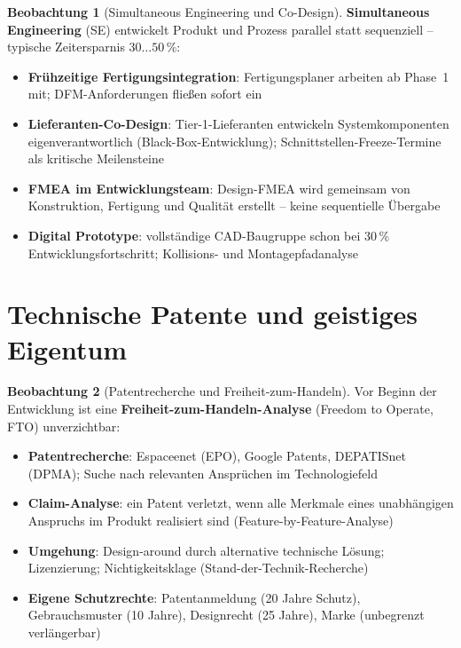 ﻿\documentclass[a4paper,12pt]{report}
\theoremstyle{definition}
\newtheorem{beobachtung}{Beobachtung}
\begin{document}
\begin{beobachtung}[Simultaneous Engineering und Co-Design]
\textbf{Simultaneous Engineering} (SE) entwickelt Produkt und Prozess
parallel statt sequenziell -- typische Zeitersparnis $30\ldots50\,\%$:
\begin{itemize}
    \item[-] \textbf{Frühzeitige Fertigungsintegration}: Fertigungsplaner
          arbeiten ab Phase~1 mit; DFM-Anforderungen fließen sofort ein
    \item[-] \textbf{Lieferanten-Co-Design}: Tier-1-Lieferanten entwickeln
          Systemkomponenten eigenverantwortlich (Black-Box-Entwicklung);
          Schnittstellen-Freeze-Termine als kritische Meilensteine
    \item[-] \textbf{FMEA im Entwicklungsteam}: Design-FMEA wird gemeinsam
          von Konstruktion, Fertigung und Qualität erstellt -- keine
          sequentielle Übergabe
    \item[-] \textbf{Digital Prototype}: vollständige CAD-Baugruppe schon
          bei 30\,\% Entwicklungsfortschritt; Kollisions- und Montagepfadanalyse
\end{itemize}
\end{beobachtung}

\section{Technische Patente und geistiges Eigentum}

\begin{beobachtung}[Patentrecherche und Freiheit-zum-Handeln]
Vor Beginn der Entwicklung ist eine \textbf{Freiheit-zum-Handeln-Analyse}
(Freedom to Operate, FTO) unverzichtbar:
\begin{itemize}
    \item[-] \textbf{Patentrecherche}: Espaceenet (EPO), Google Patents,
          DEPATISnet (DPMA); Suche nach relevanten Ansprüchen im Technologiefeld
    \item[-] \textbf{Claim-Analyse}: ein Patent verletzt, wenn alle Merkmale
          eines unabhängigen Anspruchs im Produkt realisiert sind
          (Feature-by-Feature-Analyse)
    \item[-] \textbf{Umgehung}: Design-around durch alternative technische Lösung;
          Lizenzierung; Nichtigkeitsklage (Stand-der-Technik-Recherche)
    \item[-] \textbf{Eigene Schutzrechte}: Patentanmeldung (20 Jahre Schutz),
          Gebrauchsmuster (10 Jahre), Designrecht (25 Jahre),
          Marke (unbegrenzt verlängerbar)
\end{itemize}
\end{beobachtung}
\end{document}
